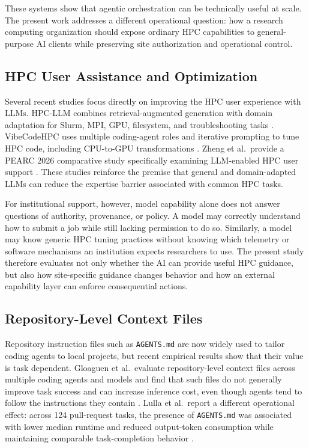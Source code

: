 \documentclass[11pt]{article}
\begin{document}
These systems show that agentic orchestration can be technically useful at scale. The present work addresses a different operational question: how a research computing organization should expose ordinary HPC capabilities to general-purpose AI clients while preserving site authorization and operational control.

\subsection{HPC User Assistance and Optimization}

Several recent studies focus directly on improving the HPC user experience with LLMs. HPC-LLM combines retrieval-augmented generation with domain adaptation for Slurm, MPI, GPU, filesystem, and troubleshooting tasks \cite{shahin2026hpcllm}. VibeCodeHPC uses multiple coding-agent roles and iterative prompting to tune HPC code, including CPU-to-GPU transformations \cite{hayashi2025vibecodehpc}. Zheng et al.\ provide a PEARC 2026 comparative study specifically examining LLM-enabled HPC user support \cite{zheng2026hpcsupport}. These studies reinforce the premise that general and domain-adapted LLMs can reduce the expertise barrier associated with common HPC tasks.

For institutional support, however, model capability alone does not answer questions of authority, provenance, or policy. A model may correctly understand how to submit a job while still lacking permission to do so. Similarly, a model may know generic HPC tuning practices without knowing which telemetry or software mechanisms an institution expects researchers to use. The present study therefore evaluates not only whether the AI can provide useful HPC guidance, but also how site-specific guidance changes behavior and how an external capability layer can enforce consequential actions.

\subsection{Repository-Level Context Files}

Repository instruction files such as \texttt{AGENTS.md} are now widely used to tailor coding agents to local projects, but recent empirical results show that their value is task dependent. Gloaguen et al.\ evaluate repository-level context files across multiple coding agents and models and find that such files do not generally improve task success and can increase inference cost, even though agents tend to follow the instructions they contain \cite{gloaguen2026agents}. Lulla et al.\ report a different operational effect: across 124 pull-request tasks, the presence of \texttt{AGENTS.md} was associated with lower median runtime and reduced output-token consumption while maintaining comparable task-completion behavior \cite{lulla2026agents}.
\end{document}
